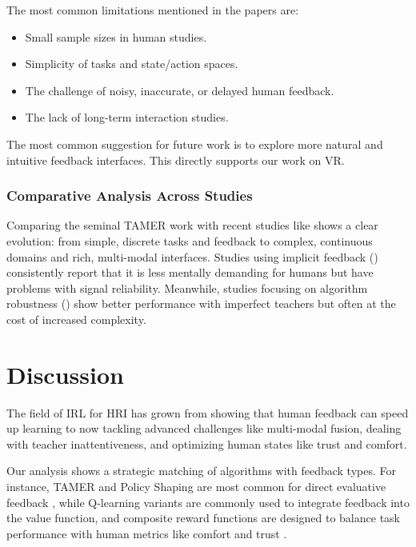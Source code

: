 \documentclass[rnd]{mas_proposal}
\begin{document}
\begin{itemize}
The most common limitations mentioned in the papers are:
\begin{itemize}
    \item Small sample sizes in human studies.
    \item Simplicity of tasks and state/action spaces.
    \item The challenge of noisy, inaccurate, or delayed human feedback.
    \item The lack of long-term interaction studies.
\end{itemize}
The most common suggestion for future work is to explore more natural and intuitive feedback interfaces. This directly supports our work on VR.

\end{itemize}

\subsubsection{Comparative Analysis Across Studies}
Comparing the seminal TAMER work \citet{BradleyKnox2008} with recent studies like \citet{Heuvel2025} shows a clear evolution: from simple, discrete tasks and feedback to complex, continuous domains and rich, multi-modal interfaces. Studies using implicit feedback (\citet{Xu2021}) consistently report that it is less mentally demanding for humans but have problems with signal reliability. Meanwhile, studies focusing on algorithm robustness (\citet{Faulkner2020, KesslerFaulkner2021}) show better performance with imperfect teachers but often at the cost of increased complexity.

\section{Discussion}
\label{sec:discussion}

The field of IRL for HRI has grown from showing that human feedback can speed up learning to now tackling advanced challenges like multi-modal fusion, dealing with teacher inattentiveness, and optimizing human states like trust and comfort.

Our analysis shows a strategic matching of algorithms with feedback types. For instance, TAMER and Policy Shaping are most common for direct evaluative feedback \citep{BradleyKnox2008, Faulkner2020}, while Q-learning variants are commonly used to integrate feedback into the value function, and composite reward functions are designed to balance task performance with human metrics like comfort \citep{GonzalezSantocildes2024} and trust \citep{Alzahrani2025}.
\end{document}
